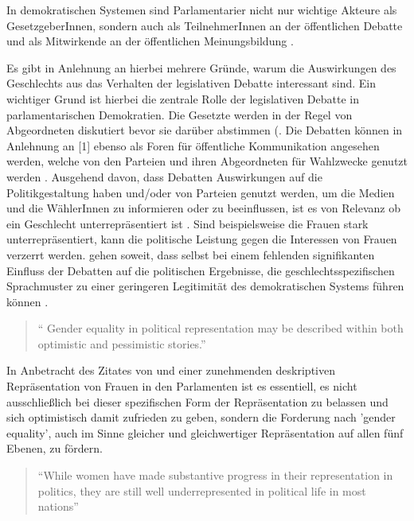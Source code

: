 \documentclass[12pt, 
    twoside=false, 
    bibliography=totoc, 
    numbers=endperiod, 
    headings=normal, 
    toc=chapterentrydotfill
    ]{scrbook}
\begin{document}
In demokratischen Systemen sind Parlamentarier nicht nur wichtige Akteure als GesetzgeberInnen, sondern auch als TeilnehmerInnen an der öffentlichen Debatte und als Mitwirkende an der öffentlichen Meinungsbildung  \parencite[188]{dahlerup_2018}.

Es gibt in Anlehnung an \textcite{back_2018} hierbei mehrere Gründe, warum die Auswirkungen des Geschlechts aus das Verhalten der legislativen Debatte interessant sind. Ein wichtiger Grund ist hierbei die zentrale Rolle der legislativen Debatte in parlamentarischen Demokratien. Die Gesetzte werden in der Regel von Abgeordneten diskutiert bevor sie darüber abstimmen (\parencites[2]{back_2018}{back_2016}{proksch_2015}. 
Die Debatten können in Anlehnung an \textcite{proksch_2015}[1] ebenso als Foren für öffentliche Kommunikation angesehen werden, welche von den Parteien und ihren Abgeordneten für Wahlzwecke genutzt werden \parencite[2]{back_2018}. Ausgehend davon, dass Debatten Auswirkungen auf die Politikgestaltung haben und/oder von Parteien genutzt werden, um die Medien und die WählerInnen zu informieren oder zu beeinflussen, ist es von Relevanz ob ein Geschlecht unterrepräsentiert ist \parencite[2]{back_2018}. Sind beispielsweise die Frauen stark unterrepräsentiert, kann die politische Leistung gegen die Interessen von Frauen verzerrt werden\parencite[2]{back_2018}. \textcite{back_2018} gehen soweit, dass selbst bei einem fehlenden signifikanten Einfluss der Debatten auf die politischen Ergebnisse, die geschlechtsspezifischen Sprachmuster zu einer geringeren Legitimität des demokratischen Systems führen können \parencite[2]{back_2018}.


\begin{quote}
\enquote{
Gender equality in political representation may be described within both optimistic
and pessimistic stories.} \parencite[149]{celis_2018}
\end{quote}

In Anbetracht des Zitates von \textcite{celis_2018} und einer zunehmenden deskriptiven Repräsentation von Frauen in den Parlamenten ist es essentiell, es nicht ausschließlich bei dieser spezifischen Form der Repräsentation zu belassen und sich optimistisch damit zufrieden zu geben, sondern die Forderung nach 'gender equality', auch im Sinne gleicher und gleichwertiger Repräsentation auf allen fünf Ebenen, zu fördern. 

\begin{quote}
    \enquote{While women have made substantive progress in their representation in politics, they are still well underrepresented in political life in most nations} \parencite[2]{coffe_2013}
\end{quote}
\end{document}
